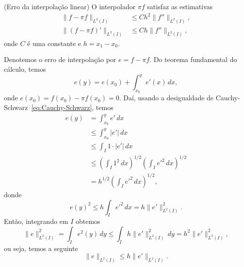 \begin{prop}\normalfont(Erro da interpolação linear)\label{prop:interp_lin}
  O interpolador $\pi f$ satisfaz as estimativas
  \begin{align}
    \|f-\pi f\|_{L^2(I)} &\leq Ch^2\|f''\|_{L^2(I)},\\
    \|(f-\pi f)'\|_{L^2(I)} &\leq Ch\|f''\|_{L^2(I)},
  \end{align}
onde $C$ é uma constante e $h=x_1-x_0$.
\end{prop}
\begin{dem}
  Denotemos o erro de interpolação por $e = f - \pi f$. Do teorema fundamental do cálculo, temos
  \begin{equation}
    e(y) = e(x_0) + \int_{x_0}^y e'(x)\,dx,
  \end{equation}
onde $e(x_0)=f(x_0)-\pi f(x_0) = 0$. Daí, usando a desigualdade de Cauchy-Schwarz~\eqref{eq:Cauchy-Schwarz}, temos
\begin{align}
  e(y) &= \int_{x_0}^y e'\,dx\\
       &\leq \int_{x_0}^y |e'|\,dx\\
       &\leq \int_{I} 1\cdot |e'|\,dx\\
       &\leq \left(\int_{I} 1^2\,dx\right)^{1/2} \left(\int_{I} e'^2\,dx\right)^{1/2}\\
       &= h^{1/2}\left(\int_{I} e'^2\,dx\right)^{1/2},
\end{align}
donde
\begin{equation}
  e(y)^2 \leq h\int_I e'^2\,dx = h\|e'\|_{L^2(I)}^2.
\end{equation}
Então, integrando em $I$ obtemos
\begin{equation}
  \|e\|_{L^2(I)}^2 = \int_I e^2(y)\,dy \leq \int_I h\|e'\|_{L^2(I)}^2\,dy = h^2\|e'\|_{L^2(I)}^2,
\end{equation}
ou seja, temos a seguinte 
\begin{equation}\label{eq:prop_pif_0}
  \|e\|_{L^2(I)} \leq h\|e'\|_{L^2(I)}.
\end{equation}


\end{dem}
